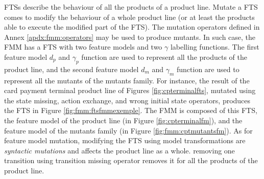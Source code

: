 \glspl{FTS} describe the behaviour of all the products of a product line. Mutate a FTS comes to modify the behaviour of a whole product line (or at least the products able to execute the modified part of the FTS). The mutation operators defined in Annex \ref{apdx:fmm:operators} may be used to produce mutants. In such case, the FMM has a FTS with two feature models and two $\gamma$ labelling functions. The first feature model $d_p$ and $\gamma_p$ function are used to represent all the products of the product line, and the second feature model $d_m$ and $\gamma_m$ function are used to represent all the mutants of the mutants family.
For instance, the result of the card payment terminal product line of Figures \ref{fig:cpterminalfts}, mutated using the state missing, action exchange, and wrong initial state operators, produces the FTS in Figure \ref{fig:fmm:ftsfmmexemple}. The FMM is composed of this FTS, the feature model of the product line (in Figure \ref{fig:cpterminalfm}), and the feature model of the mutants family (in Figure \ref{fig:fmm:cptmutantsfm}). 
As for feature model mutation, modifying the FTS using model transformations are \emph{syntactic mutations} and affects the product line as a whole. \Eg removing one transition using transition missing operator removes it for all the products of the product line.

\newcommand{\wFe}{\mathit{fe}}

